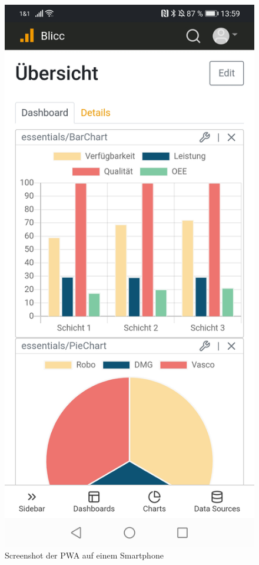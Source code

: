 \begin{figure}[h]
    \includegraphics[scale=0.15]{img/android/Dashboard}
    \caption{Screenshot der PWA auf einem Smartphone}
\end{figure}
